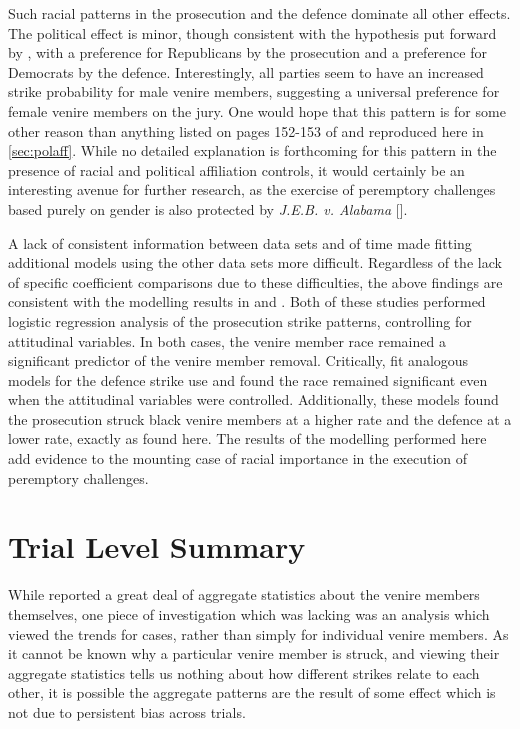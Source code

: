 Such racial patterns in the prosecution and the defence dominate all other effects. The political effect is minor, though
consistent with the hypothesis put forward by \cite{revesz2016}, with a preference for Republicans by the prosecution and a
preference for Democrats by the defence. Interestingly, all parties
seem to have an increased strike probability for male venire
members, suggesting a universal preference for female venire members on the jury. One would hope that this pattern is for some
other reason than anything listed on pages 152-153 of \cite{vandykejurysel} and reproduced here in \ref{sec:polaff}. While no
detailed explanation is forthcoming for this pattern in the presence of racial and political affiliation controls, it would
certainly be an interesting avenue for further research, as the exercise of peremptory challenges based purely on gender is also
protected by \textit{J.E.B. v. Alabama} [\cite{jebvalabama}].

A lack of consistent information between data sets and of time made fitting additional models using the other data sets more
difficult. Regardless of the lack of specific coefficient comparisons due to these difficulties, the above findings are consistent
with the modelling results in \cite{StubbornLegacy} and \cite{PerempChalMurder}. Both of these studies performed logistic
regression analysis of the prosecution strike patterns, controlling for attitudinal variables. In both cases, the venire member
race remained a significant predictor of the venire member removal. Critically, \citeauthor{PerempChalMurder} fit analogous
models for the defence strike use and found the race remained significant even when the attitudinal variables were
controlled. Additionally, these models found the prosecution struck black venire members at a higher rate and the defence at a
lower rate, exactly as found here. The results of the modelling performed here add evidence to the mounting case of racial
importance in the execution of peremptory challenges.
                
\section{Trial Level Summary} \label{sec:casesum}

While \cite{JurySunshineProj} reported a great deal of aggregate statistics about the venire members themselves, one piece of
investigation which was lacking was an analysis which viewed the trends for cases, rather than simply for
individual venire members. As it cannot be known why a particular venire member is struck, and viewing their aggregate
statistics tells us nothing about how different strikes relate to each other, it is possible the aggregate patterns are the result
of some effect which is not due to persistent bias across trials.

